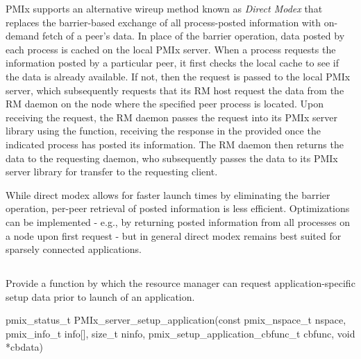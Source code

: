 \ac{PMIx} supports an alternative wireup method known as \textit{Direct Modex} that replaces the barrier-based exchange of all process-posted information with on-demand fetch of a peer's data. In place of the barrier operation, data posted by each process is cached on the local \ac{PMIx} server. When a process requests the information posted by a particular peer, it first checks the local cache to see if the data is already available. If not, then the request is passed to the local \ac{PMIx} server, which subsequently requests that its \ac{RM} host request the data from the \ac{RM} daemon on the node where the specified peer process is located. Upon receiving the request, the \ac{RM} daemon passes the request into its \ac{PMIx} server library using the  function, receiving the response in the provided  once the indicated process has posted its information. The \ac{RM} daemon then returns the data to the requesting daemon, who subsequently passes the data to its \ac{PMIx} server library for transfer to the requesting client.

\adviceuserstart
While direct modex allows for faster launch times by eliminating the barrier operation, per-peer retrieval of posted information is less efficient. Optimizations can be implemented - e.g., by returning posted information from all processes on a node upon first request - but in general direct modex remains best suited for sparsely connected applications.
\adviceuserend

\subsection{}

\summary

Provide a function by which the resource manager can request application-specific setup data prior to launch of an application.

\format

\cspecificstart
\begin{codepar}
pmix_status_t
PMIx_server_setup_application(const pmix_nspace_t nspace,
                        pmix_info_t info[], size_t ninfo,
                        pmix_setup_application_cbfunc_t cbfunc,
                        void *cbdata)
\end{codepar}
\cspecificend

\begin{arglist}
\end{arglist}

